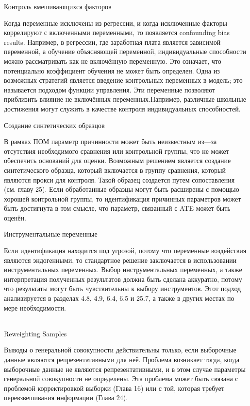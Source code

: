 \begin{center}
Контроль вмешивающихся факторов
\end{center}


Когда переменные исключены из регрессии, и когда исключенные факторы коррелируют с включенными переменными, то появляется confounding bias results. Например, в регрессии, где заработная плата является зависимой переменной, а обучение объясняющей переменной, индивидуальные способности можно рассматривать как не включённую переменную. Это означает, что потенциально коэффициент обучения не может быть определен. Одна из возможных стратегий является введение контрольных переменных в модель; это называется подходом функции управления. Эти переменные позволяют приблизить влияние не включённых переменных.Например, различные школьные достижения могут служить в качестве контроля индивидуальных способностей.



\begin{center}
Создание синтетических образцов
\end{center}


В рамках ПОМ параметр причинности может быть неизвестным из---за отсутствия необходимого сравнения или контрольной группы, что не может обеспечить оснований для оценки. Возможным решением является создание синтетического образца, который включается в группу сравнения, который являются прокси для контроля. Такой образец создается путем сопоставления (см. главу 25). Если обработанные образцы могут быть расширены с помощью хорошей контрольной группы, то идентификация причинных параметров может быть достигнута в том смысле, что параметр, связанный с ATE может быть оценён.


\begin{center}
Инструментальные переменные
\end{center}


Если идентификация находится под угрозой, потому что переменные воздействия являются эндогенными, то стандартное решение заключается в использовании инструментальных переменных. Выбор инструментальных переменных, а также интерпретация полученных результатов должна быть сделана аккуратно, потому что результаты могут быть чувствительны к выбору инструментов. Этот подход анализируется в разделах 4.8, 4.9, 6.4, 6.5 и 25.7, а также в других местах по мере необходимости.
\\
\\
\begin{center}
Reweighting Samples
\end{center}


Выводы о генеральной совокупности действительны только, если выборочные данные являются репрезентативными для неё. Проблема возникает тогда, когда выборочные данные не являются репрезентативными, и в этом случае параметры генеральной совокупности не определены. Эта проблема может быть связана с проблемой корректировкой выборки (Глава 16) или с той, которая требует перевзвешивания информации (Глава 24).













